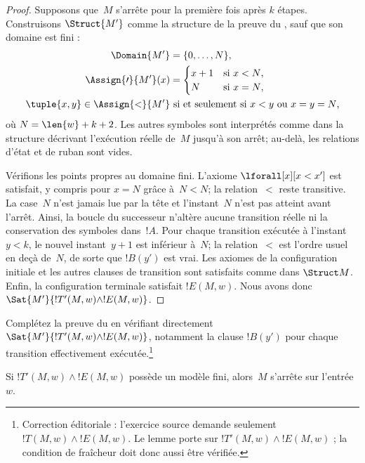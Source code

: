 \documentclass[../../../include/open-logic-section]{subfiles}
\begin{document}
\begin{proof}
Supposons que~$M$ s'arrête pour la première fois après $k$ étapes.
Construisons $\Struct{M'}$ comme la structure de la preuve du
, sauf que son domaine est fini :
\begin{align*}
\Domain{M'}&=\{0,\dots,N\},\\
\Assign{\prime}{M'}(x)&=
\begin{cases}
  x+1 &\text{si $x<N$,}\\
  N &\text{si $x=N$,}
\end{cases}\\
\tuple{x,y}\in\Assign{<}{M'}
&\text{ si et seulement si $x<y$ ou $x=y=N$,}
\end{align*}
où $N=\len{w}+k+2$. Les autres symboles sont interprétés
comme dans la structure décrivant l'exécution réelle de~$M$
jusqu'à son arrêt; au-delà, les relations d'état et de ruban
sont vides.

Vérifions les points propres au domaine fini. L'axiome
$\lforall[x][x<x']$ est satisfait, y compris pour $x=N$
grâce à~$N<N$; la relation~$<$ reste transitive.
La case~$N$ n'est jamais lue par la tête et l'instant~$N$
n'est pas atteint avant l'arrêt. Ainsi, la boucle du
successeur n'altère aucune transition réelle ni la conservation
des symboles dans~$!A$. Pour chaque transition exécutée à
l'instant~$y<k$, le nouvel instant~$y+1$ est inférieur à~$N$;
la relation~$<$ est l'ordre usuel en deçà de~$N$, de sorte que
$!B(y')$ est vrai. Les axiomes de la configuration initiale et
les autres clauses de transition sont satisfaits comme dans
$\Struct M$. Enfin, la configuration terminale satisfait
$!E(M,w)$. Nous avons donc
$\Sat{M'}{!T'(M,w)\land !E(M,w)}$.
\end{proof}

\begin{prob}
Complétez la preuve du 
en vérifiant directement
$\Sat{M'}{!T'(M,w)\land !E(M,w)}$, notamment la clause
$!B(y')$ pour chaque transition effectivement exécutée.\footnote{Correction éditoriale : l'exercice source demande seulement $!T(M,w)\land !E(M,w)$. Le lemme porte sur $!T'(M,w)\land !E(M,w)$ ; la condition de fraîcheur doit donc aussi être vérifiée.}
\end{prob}

\begin{lem}
Si $!T'(M,w)\land !E(M,w)$ possède un modèle fini, alors~$M$
s'arrête sur l'entrée~$w$.
\end{lem}
\end{document}
